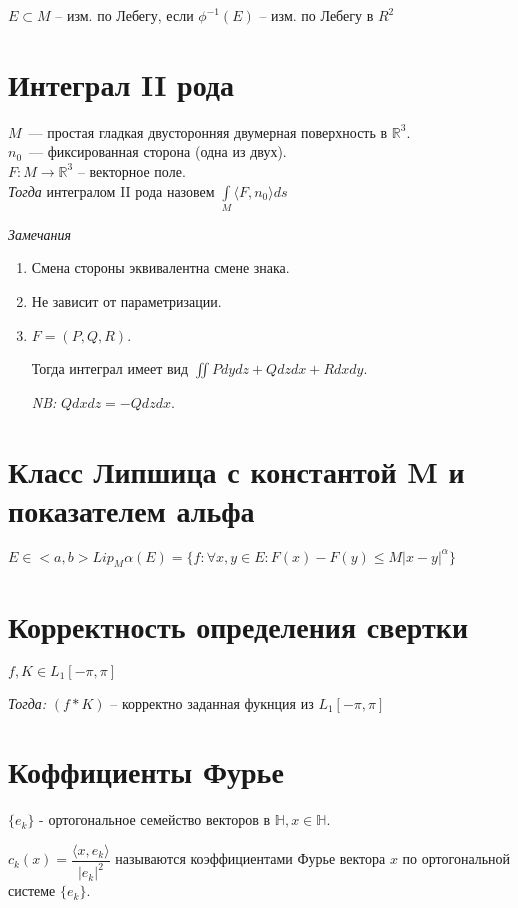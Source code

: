 \documentclass[paper=a4, fontsize=14pt]{article}
\begin{document}
$ E \subset M $ -- изм. по Лебегу, если $ \phi^{-1}(E) $ -- изм. по Лебегу в $ R^2 $

\section{Интеграл II рода}

$M$~--- простая гладкая двусторонняя двумерная поверхность в $\mathds{R}^3$.\\
$n_0$~--- фиксированная сторона (одна из двух).\\
$F : M \rightarrow \mathbb{R}^3$ -- векторное поле.\\

\emph{Тогда} интегралом II рода назовем $\int\limits_{M} \langle F, n_0 \rangle ds$

\emph{Замечания}
\begin{enumerate}
\item Смена стороны эквивалентна смене знака.
\item Не зависит от параметризации.
\item
$F=(P, Q, R)$.

Тогда интеграл имеет вид $\iint P dydz + Q dzdx + R dxdy$.

\emph{NB:} $Q dxdz = -Q dzdx$.
\end{enumerate}

\section{Класс Липшица с константой M и показателем альфа}
$E \in <a, b>   Lip_M \alpha(E) = \{f: \forall x,y \in E : F(x) - F(y) \leq M|x-y|^\alpha\}$

\section{Корректность определения свертки}

$ f, K \in L_1[-\pi, \pi] $

\emph{Тогда:} $ (f * K)$ -- корректно заданная фукнция из $ L_1[-\pi, \pi] $

\section{Коффициенты Фурье}
$\{e_k\}$ - ортогональное семейство векторов в $\mathds{H}, x \in \mathds{H}$.

$c_k(x) = \dfrac{\langle x, e_k \rangle}{|e_k|^2}$ называются коэффициентами Фурье вектора $x$ по ортогональной системе $\{e_k\}$.
\end{document}
